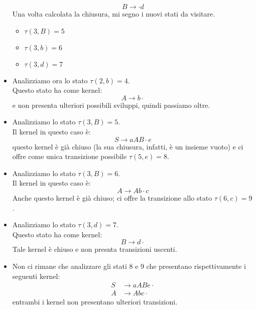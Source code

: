 \documentclass[class=book, crop=false, oneside, 12pt]{standalone}
\begin{document}
\begin{itemize}
    \begin{equation*}
        B \to \cdot d
    \end{equation*}
    Una volta calcolata la chiusura, mi segno i nuovi stati da visitare.
    \begin{itemize}
        \item \(\tau (3, B) = 5\)
        \item \(\tau (3, b) = 6\)
        \item \(\tau (3, d) = 7\)
    \end{itemize}
    \item Analizziamo ora lo stato \(\tau (2, b) = 4\). \\
    Questo stato ha come kernel:
    \begin{equation*}
        A \to b \cdot
    \end{equation*}
    e non presenta ulteriori possibili sviluppi, quindi passiamo oltre.
    \item Analizziamo lo stato \(\tau (3, B) = 5\). \\
    Il kernel in questo caso è:
    \begin{equation*}
        S \to aAB \cdot e
    \end{equation*}
    questo kernel è già chiuso (la sua chiusura, infatti, è un insieme vuoto) e ci offre come unica transizione possibile \(\tau (5, e) = 8\).
    \item Analizziamo lo stato \(\tau (3, B) = 6\). \\
    Il kernel in questo caso è:
    \begin{equation*}
        A \to Ab \cdot c
    \end{equation*}
    Anche questo kernel è già chiuso; ci offre la transizione allo stato \(\tau (6, c) = 9\).
    \item Analizziamo lo stato \(\tau (3, d) = 7\). \\
    Questo stato ha come kernel:
    \begin{equation*}
        B \to d \cdot 
    \end{equation*}
    Tale kernel è chiuso e non presnta transizioni uscenti.
    \item Non ci rimane che analizzare gli stati \(8\) e \(9\) che presentano rispettivamente i seguenti kernel:
    \begin{align*}
        S &\to aABe \cdot \\
        A &\to Abc \cdot
    \end{align*}
    entrambi i kernel non presentano ulteriori transizioni.
\end{itemize}
\end{document}
